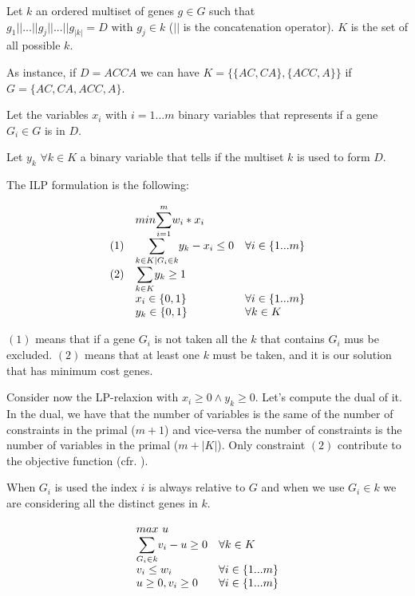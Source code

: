 \documentclass[paper=a4, fontsize=11pt]{scrartcl} %
\numberwithin{equation}{section} %
\numberwithin{figure}{section} %
\numberwithin{table}{section} %
\begin{document}
Let $k$ an ordered multiset of genes $g \in G$ such that $g_1 || ... || g_j || ... || g_{|k|} = D \text{ with } g_j \in k$ ($||$ is the concatenation operator). $K$ is the set of all possible $k$.

As instance, if $D = ACCA$ we can have $K = \{\{AC,CA\},\{ACC,A\}\}$ if $G = \{AC,CA,ACC,A\}$.

Let the variables $x_i$ with $i = 1 ... m$ binary variables that represents if a gene $G_i \in G$ is in $D$. 

Let $y_k$ $\forall k \in K$ a binary variable that tells if the multiset $k$ is used to form $D$.

The ILP formulation is the following:

\[
    \begin{array}{lll}
    & min \mathlarger{\sum}_{i = 1}^m w_i*x_i & \\
    (1) & \mathlarger{\sum}_{k \in K | G_i \in k} y_k - x_i \leq 0 & \forall i \in \{1 ... m\} \\
    (2) & \mathlarger{\sum}_{k \in K} y_k \geq 1 & \\
    & x_i \in \{0, 1\} & \forall i \in \{1 ... m\} \\
    & y_k \in \{0, 1\} & \forall k \in K
    \end{array}
\]

$(1)$ means that if a gene $G_i$ is not taken all the $k$ that contains $G_i$ mus be excluded. $(2)$ means that at least one $k$ must be taken, and it is our solution that has minimum cost genes.

Consider now the LP-relaxion with $x_i \geq 0 \land y_k \geq 0$. Let's compute the dual of it.
In the dual, we have that the number of variables is the same of the number of constraints in the primal ($m+1$) and vice-versa the number of constraints is the number of variables in the primal ($m+|K|$).
Only constraint $(2)$ contribute to the objective function (cfr. \cite{cap8roma}).

When $G_i$ is used the index $i$ is always relative to $G$ and when we use $G_i \in k$ we are considering all the distinct genes in $k$.

\[
    \begin{array}{ll}
    max\text{ }u & \\
    \mathlarger{\sum}_{G_i \in k} v_i - u \geq 0 & \forall k \in K \\
    v_i \leq w_i & \forall i \in \{1 ... m\}\\
    u \geq 0, v_i \geq 0 & \forall i \in \{1 ... m\}
    \end{array}
\]
\end{document}
